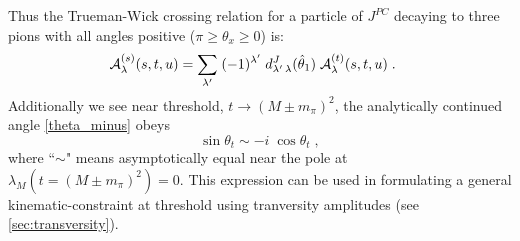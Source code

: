 Thus the Trueman-Wick crossing relation for a particle of \(J^{PC}\) decaying to three pions with all angles positive (\(\pi \geq \theta_x \geq 0\)) is:
    \begin{align}
      \label{final-TW-relation}
     \mathcal{A}^{(s)}_\lambda(s,t,u) &= \sum_{{\lambda^\prime}} \; (-1)^{\lambda^\prime} \; d_{{\lambda^\prime} \, \lambda}^J(\hat{\theta}_1) \; \mathcal{A}_\lambda^{(t)}(s,t,u) \; .
   \end{align}
Additionally we see near threshold, \(t \to (M\pm m_\pi)^2\), the analytically continued angle \cref{theta_minus} obeys
  \begin{equation}
    \label{sin-eps}
    \sin\theta_t \sim - i \; \cos\theta_t \; ,
  \end{equation}
where ``\(\sim\)" means asymptotically equal near the pole at \(\lambda_M(t = (M\pm m_\pi)^2) = 0\). This expression can be used in formulating a general kinematic-constraint at threshold using tranversity amplitudes (see \cref{sec:transversity}).
